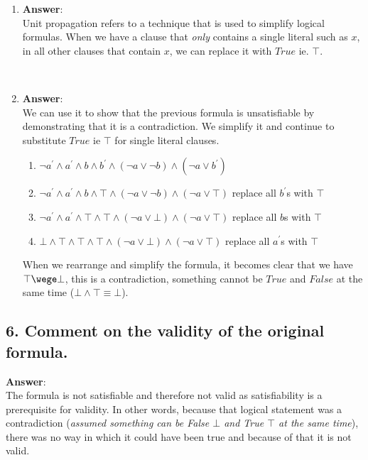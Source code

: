 \documentclass[a4paper, 14pt]{report}
\newcommand{\answer}[1]{%
	\begin{flushleft}
		\textbf{Answer}:\\
			#1
	\end{flushleft}}
\newcommand{\question}[1]{\subsection*{#1}}
\begin{document}
\begin{enumerate}		

	\item \answer{%
			Unit propagation refers to a technique that is used to simplify
			logical formulas.
			When we have a clause that \textit{only} contains a single literal
			such as $ x $, in all other clauses that contain $ x $, we can
			replace it with $ True $ ie. $\top$.} \\


	\item \answer{We can use it to show that the previous formula is
		unsatisfiable by demonstrating that it is a contradiction.
		We simplify it and continue to substitute $True$
		ie $\top$ for single literal clauses.

		\begin{enumerate}		
			\item $ \neg a^\prime \wedge a^\prime \wedge b \wedge b^\prime \wedge (\neg a \vee \neg b)  \wedge (\neg a \vee b^\prime) $ 
			\item $ \neg a^\prime \wedge a^\prime \wedge b \wedge \top \wedge (\neg a \vee \neg b)  \wedge (\neg a \vee \top) $ replace all $b^\prime$s with $\top$  \\
			\item $ \neg a^\prime \wedge a^\prime \wedge \top \wedge \top \wedge (\neg a \vee \bot)  \wedge (\neg a \vee \top) $ replace all $b$s with $\top$  \\
			\item $ \bot \wedge \top \wedge \top \wedge \top \wedge (\neg a \vee \bot)  \wedge (\neg a \vee \top) $ replace all $a^\prime$s with $\top$  \\
		\end{enumerate}			

		When we rearrange and simplify the formula, it becomes clear that we have 
	$\top \wege \bot$, this is a contradiction, something cannot be $True$ and $False$ at the same time ($\bot \wedge \top \equiv \bot$).}

\end{enumerate}		

\question{6. Comment on the validity of the original formula.} 

\answer{The formula is not satisfiable and therefore not valid as satisfiability is
	a prerequisite for validity. In other words, because that logical statement
	was a contradiction (\textit{assumed something can be False $\bot$ and True $\top$ at the same time}), there was no way in which it could have been true and
	because of that it is not valid.}
\end{document}
